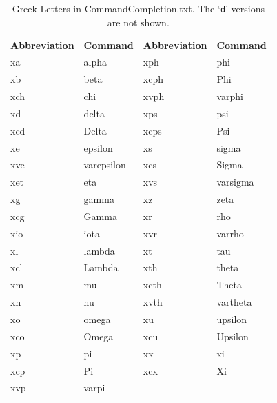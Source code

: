 \documentclass[11pt]{article}
\newcommand{\CCT}{\textsf{CommandCompletion.txt}}
\begin{document}
\begin{table}\small\centering
\begin{tabular}{llll}
\textbf{Abbreviation} & \textbf{Command} & \textbf{Abbreviation} & \textbf{Command} \\
\cmidrule[0.5pt](lr){1-1} \cmidrule[0.5pt](lr){2-2} \cmidrule[0.5pt](lr){3-3} \cmidrule[0.5pt](lr){4-4}
xa  & alpha      & xph  & phi \\
xb  & beta       & xcph & Phi \\
xch & chi        & xvph & varphi \\
xd  & delta      & xps  & psi \\
xcd & Delta      & xcps & Psi \\
xe  & epsilon    & xs   & sigma \\
xve & varepsilon & xcs  & Sigma \\
xet & eta        & xvs  & varsigma \\
xg  & gamma      & xz   & zeta \\
xcg & Gamma      & xr   & rho \\
xio & iota       & xvr  & varrho \\
xl  & lambda     & xt   & tau \\
xcl & Lambda     & xth  & theta \\
xm  & mu         & xcth & Theta \\
xn  & nu         & xvth & vartheta \\
xo  & omega      & xu   & upsilon \\
xco & Omega      & xcu  & Upsilon \\
xp  & pi         & xx   & xi \\
xcp & Pi         & xcx  & Xi \\
xvp & varpi      &      & \\
\end{tabular}
\caption{Greek Letters in \CCT. The `\texttt{d}' versions are not shown.}
\label{tbl:greek}
\end{table}
\end{document}
